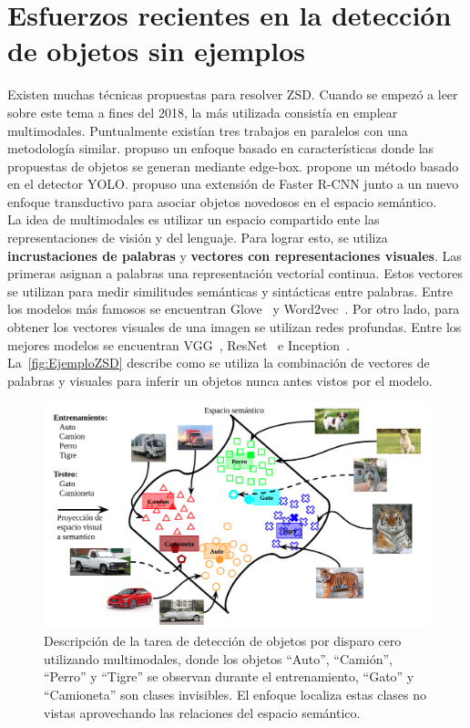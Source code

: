 \section{Esfuerzos recientes en la detección de objetos sin ejemplos}\label{sec:esfuerzosrecientesenladetecciondeobjetossinejemplos}

Existen muchas técnicas propuestas para resolver ZSD. Cuando se empezó a leer sobre este tema a fines del 2018, la más utilizada consistía en emplear multimodales. Puntualmente existían tres trabajos en paralelos con una metodología similar. \cite{bansal2018zero} propuso un enfoque basado en características donde las propuestas de objetos se generan mediante edge-box. \cite{zhu2018zero} propone un método basado en el detector YOLO. \cite{rahman2018zero} propuso una extensión de Faster R-CNN junto a un nuevo enfoque transductivo para asociar objetos novedosos en el espacio semántico.\\
 
La idea de multimodales es utilizar un espacio compartido ente las representaciones de visión y del lenguaje. Para lograr esto, se utiliza  \textbf{incrustaciones de palabras} y \textbf{vectores con representaciones visuales}. Las primeras asignan a palabras una representación vectorial continua. Estos vectores se utilizan para medir similitudes semánticas y sintácticas entre palabras. Entre los modelos más famosos se encuentran Glove~\cite{pennington-etal-2014-glove} y Word2vec~\cite{mikolov2013efficient}. Por otro lado, para obtener los vectores visuales de una imagen se utilizan redes profundas. Entre los mejores modelos se encuentran VGG~\cite{simonyan2014very}, ResNet~\cite{resnet} e Inception~\cite{Szegedy_2015_CVPR}. La~\autoref{fig:EjemploZSD} describe como se utiliza la combinación de vectores de palabras y visuales para inferir un objetos nunca antes vistos por el modelo.\\

\begin{figure}[]
	\centering
	\includegraphics[width=1\textwidth]{img/Modelo.png}
	\caption{Descripción de la tarea de detección de objetos por disparo cero utilizando multimodales, donde los objetos ``Auto'', ``Camión'', ``Perro'' y ``Tigre'' se observan  durante el entrenamiento,  ``Gato'' y ``Camioneta'' son clases invisibles. El enfoque localiza estas clases no vistas aprovechando las relaciones del espacio semántico.}
	\label{fig:EjemploZSD}
\end{figure}

